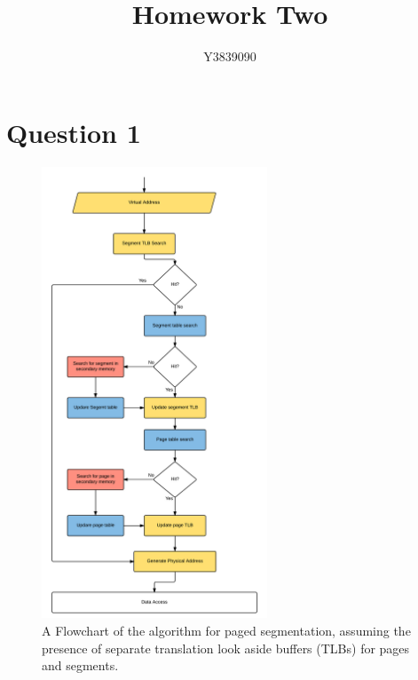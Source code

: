 \documentclass[12pt]{article}
\title{Homework Two}
\author{Y3839090}
\begin{document}
\maketitle

\tableofcontents %
\listoffigures %
{} %

	\section{Question 1}

		\begin{figure}[H]
			\centering
			\includegraphics[width=0.6\textwidth]{Paged_Segmentation_Flowchart.png}
			\caption{ A Flowchart of the algorithm for paged segmentation, assuming the presence of separate translation look aside buffers (TLBs) for pages and segments.}
		\end{figure}
\end{document}
